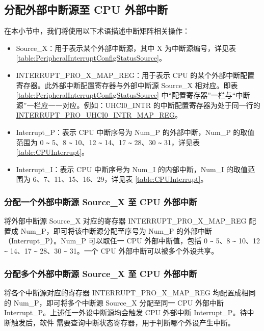 \documentclass[main\_\_CN.tex]{subfiles}
\begin{document}
\subsection{分配外部中断源至 CPU 外部中断}

在本小节中，我们将使用以下术语描述中断矩阵相关操作：
\begin{itemize}

\item Source\_X：用于表示某个外部中断源，其中 X 为中断源编号，详见表 \ref{table:PeripheralInterruptConfigStatusSource}。
\item INTERRUPT\_PRO\_X\_MAP\_REG：用于表示 CPU 的某个外部中断配置寄存器。此外部中断配置寄存器与外部中断源 Source\_X 相对应。即表 \ref{table:PeripheralInterruptConfigStatusSource} 中“配置寄存器”一栏与“中断源”一栏应一一对应。例如：UHCI0\_INTR 的中断配置寄存器为处于同一行的 \hyperref[regdesc:INTERRUPTPROUHCI0INTRMAPREG]{INTERRUPT\_PRO\_UHCI0\_INTR\_MAP\_REG}。
\item Interrupt\_P：表示 CPU 中断序号为 Num\_P 的外部中断，Num\_P 的取值范围为 0 \verb+~+ 5、8 \verb+~+ 10、12 \verb+~+ 14、17 \verb+~+ 28、30 \verb+~+ 31，详见表 \ref{table:CPUInterrupt}。
\item Interrupt\_I：表示 CPU 中断序号为 Num\_I 的内部中断，Num\_I 的取值范围为 6、7、11、15、16、29，详见表 \ref{table:CPUInterrupt}。
\end{itemize}

\subsubsection{分配一个外部中断源 Source\_X 至 CPU 外部中断}

将外部中断源 Source\_X 对应的寄存器 INTERRUPT\_PRO\_X\_MAP\_REG 配置成 Num\_P，即可将该中断源分配至序号为 Num\_P 的外部中断（Interrupt\_P）。Num\_P 可以取任一 CPU 外部中断值，包括 0 \verb+~+ 5、8 \verb+~+ 10、12 \verb+~+ 14、17 \verb+~+ 28、30 \verb+~+ 31。一个 CPU 外部中断可以被多个外设共享。


\subsubsection{分配多个外部中断源 Source\_X 至 CPU 外部中断}

将各个中断源对应的寄存器 INTERRUPT\_PRO\_X\_MAP\_REG 均配置成相同的 Num\_P，即可将多个中断源 Source\_X 分配至同一 CPU 外部中断 Interrupt\_P。上述任一外设中断源均会触发 CPU 外部中断 Interrupt\_P。待中断触发后，软件 需要查询中断状态寄存器，用于判断哪个外设产生中断。
\end{document}
